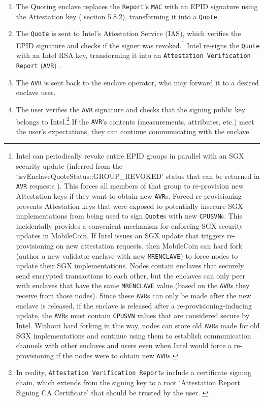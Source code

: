 \begin{enumerate}
    \item The Quoting enclave replaces the {\tt Report}'s {\tt MAC} with an EPID signature using the Attestation key (\cite{intel-sgx-explained-advanced} section 5.8.2), transforming it into a {\tt Quote}.
    \item The {\tt Quote} is sent to Intel's Attestation Service (IAS), which verifies the EPID signature and checks if the signer was revoked.\footnote{\label{footnote:enclaves-revoke-epid-groups-hard-fork-force-update}Intel can periodically revoke entire EPID groups in parallel with an SGX security update (inferred from the `isvEnclaveQuoteStatus::GROUP\_REVOKED' status that can be returned in {\tt AVR} requests \cite{sgx-attestation-service-api}). This forces all members of that group to re-provision new Attestation keys if they want to obtain new {\tt AVR}s. Forced re-provisioning prevents Attestation keys that were exposed to potentially insecure SGX implementations from being used to sign {\tt Quote}s with new {\tt CPUSVN}s. This incidentally provides a convenient mechanism for enforcing SGX security updates in MobileCoin. If Intel issues an SGX update that triggers re-provisioning on new attestation requests, then MobileCoin can hard fork (author a new validator enclave with new {\tt MRENCLAVE}) to force nodes to update their SGX implementations. Nodes contain enclaves that securely send encrypted transactions to each other, but the enclaves can only peer with enclaves that have the same {\tt MRENCLAVE} value (based on the {\tt AVR}s they receive from those nodes). Since these {\tt AVR}s can only be made after the new enclave is released, if the enclave is released after a re-provisioning-inducing update, the {\tt AVR}s must contain {\tt CPUSVN} values that are considered secure by Intel. Without hard forking in this way, nodes can store old {\tt AVR}s made for old SGX implementations and continue using them to establish communication channels with other enclaves and users even when Intel would force a re-provisioning if the nodes were to obtain new {\tt AVR}s.} Intel re-signs the {\tt Quote} with an Intel RSA key, transforming it into an {\tt Attestation Verification Report} ({\tt AVR}) \cite{sgx-attestation-service-api}.
    \item The {\tt AVR} is sent back to the enclave operator, who may forward it to a desired enclave user.
    \item The user verifies the {\tt AVR} signature and checks that the signing public key belongs to Intel.\footnote{In reality, {\tt Attestation Verification Report}s include a certificate signing chain, which extends from the signing key to a root `Attestation Report Signing CA Certificate' that should be trusted by the user. \cite{sgx-attestation-service-api}} If the {\tt AVR}'s contents (measurements, attributes, etc.) meet the user's expectations, they can continue communicating with the enclave.
\end{enumerate}




